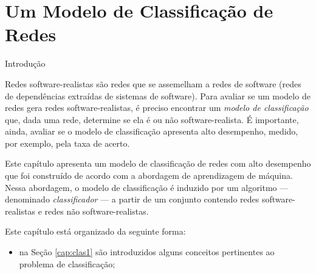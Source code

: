 \chapter{Um Modelo de Classificação de Redes} \label{cap:classificacao}


\begin{section}{Introdução}
	
	
	Redes software-realistas são redes que se assemelham a redes de software (redes de dependências extraídas de sistemas de software). Para avaliar se um modelo de redes gera redes software-realistas, é preciso encontrar um \emph{modelo de classificação} que, dada uma rede, determine se ela é ou não software-realista. É importante, ainda, avaliar se o modelo de classificação apresenta alto desempenho, medido, por exemplo, pela taxa de acerto.
	
	Este capítulo apresenta um modelo de classificação de redes com alto desempenho que foi construído de acordo com a abordagem de aprendizagem de máquina. Nessa abordagem, o modelo de classificação é induzido por um algoritmo --- denominado \emph{classificador} --- a partir de um conjunto contendo redes software-realistas e redes não software-realistas.
	
	Este capítulo está organizado da seguinte forma:
	
	\begin{itemize}
		\item na Seção \ref{cap:clas1} são introduzidos alguns conceitos pertinentes ao problema de classificação;
		
		

\end{itemize}
\end{section}
